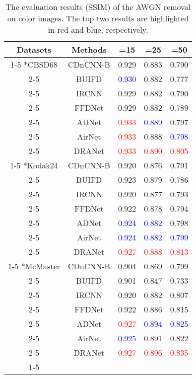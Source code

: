 \documentclass[3p,times]{elsarticle}
\begin{document}
\begin{table}[htbp]
\centering
\caption{The evaluation results (SSIM) of the AWGN removal on color images. The top two results are highlighted in red and blue, respectively.}
\label{tab:color_SSIM}
\begin{tabular}{ccccc}
\hline
Datasets & Methods & =15 & =25 & =50\\
\cline{1-5}
\multirow{7}*{CBSD68} & CDnCNN-B \cite{Zhang2017} & 0.929 & 0.883 & 0.790\\
\cline{2-5}
    & BUIFD \cite{Helou2020} & \textcolor{blue}{0.930} & 0.882 & 0.777\\
\cline{2-5}
    & IRCNN  \cite{ZhangZGZ2017} & 0.929 & 0.882 & 0.790\\
\cline{2-5}
    & FFDNet \cite{Zhang2018} & 0.929 & 0.882 & 0.789 \\
\cline{2-5}
    & ADNet \cite{TianX2020}  & \textcolor{red}{0.933} & \textcolor{blue}{0.889} & 0.797\\
\cline{2-5}
    & AirNet \cite{Li2022} & \textcolor{red}{0.933} & 0.888 & \textcolor{blue}{0.798}\\
\cline{2-5}
    & DRANet & \textcolor{red}{0.933} & \textcolor{red}{0.890} & \textcolor{red}{0.805}\\
\cline{1-5}
\multirow{7}*{Kodak24} & CDnCNN-B \cite{Zhang2017} & 0.920 & 0.876 & 0.791\\
\cline{2-5}
    & BUIFD \cite{Helou2020} & 0.923 & 0.879 & 0.786\\
\cline{2-5}
    & IRCNN  \cite{ZhangZGZ2017} & 0.920 & 0.877 & 0.793\\
\cline{2-5}
    & FFDNet \cite{Zhang2018} & 0.922 & 0.878 & 0.794\\
\cline{2-5}
    & ADNet \cite{TianX2020}  & \textcolor{blue}{0.924} & \textcolor{blue}{0.882} & 0.798\\
\cline{2-5}
    & AirNet \cite{Li2022} & \textcolor{blue}{0.924} & \textcolor{blue}{0.882} & \textcolor{blue}{0.799}\\
\cline{2-5}
    & DRANet & \textcolor{red}{0.927} & \textcolor{red}{0.888} & \textcolor{red}{0.813}\\
\cline{1-5}
\multirow{7}*{McMaster} & CDnCNN-B \cite{Zhang2017} & 0.904 & 0.869 & 0.799\\
\cline{2-5}
    & BUIFD \cite{Helou2020} & 0.901 & 0.847 & 0.733\\
\cline{2-5}
    & IRCNN  \cite{ZhangZGZ2017} & 0.920 & 0.882 & 0.807\\
\cline{2-5}
    & FFDNet \cite{Zhang2018} & 0.922 & 0.886 & 0.815 \\
\cline{2-5}
    & ADNet \cite{TianX2020}  & \textcolor{red}{0.927} & \textcolor{blue}{0.894} & \textcolor{blue}{0.825}\\
\cline{2-5}
    & AirNet \cite{Li2022} & \textcolor{blue}{0.925} & 0.891 & 0.822\\
\cline{2-5}
    & DRANet & \textcolor{red}{0.927} & \textcolor{red}{0.896} & \textcolor{red}{0.835}\\
\cline{1-5}
\end{tabular}
\end{table}
\end{document}

